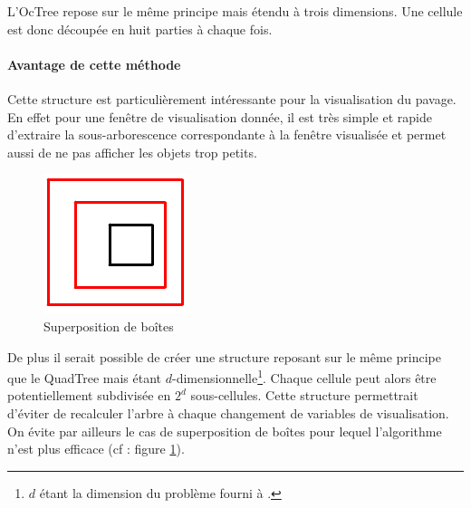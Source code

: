 L'OcTree repose sur le même principe mais étendu à trois dimensions. Une cellule est donc découpée en huit parties à chaque fois.

\paragraph{Avantage de cette méthode}Cette structure est particulièrement intéressante pour la visualisation du pavage. En effet pour une fenêtre de visualisation donnée, il est très simple et rapide d'extraire la sous-arborescence correspondante à la fenêtre visualisée et permet aussi de ne pas afficher les objets trop petits. 


\begin{figure}[h!]
\centering
\includegraphics[scale=0.30]{img/QT8}
\caption{Superposition de boîtes}
\label{fig:superpos}
\end{figure}
De plus il serait possible de créer une structure reposant sur le même principe que le QuadTree mais étant $d$-dimensionnelle\footnote{$d$ étant la dimension du problème fourni à \realpaver.}. Chaque cellule peut alors être potentiellement subdivisée en $2^d$ sous-cellules. Cette structure permettrait d'éviter de recalculer l'arbre à chaque changement de variables de visualisation. On évite par ailleurs le cas de superposition de boîtes pour lequel l'algorithme n'est plus efficace (cf : figure \ref{fig:superpos}).


